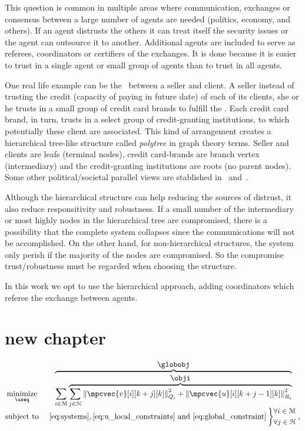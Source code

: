 \documentclass[../main.tex]{subfiles}
\begin{document}
This question is common in multiple areas where communication, exchanges or consensus between a large number of agents are needed (politics, economy, and others).
If an agent distrusts the others it can treat itself the security issues or the agent can outsource it to another.
Additional agents are included to serve as referees, coordinators or certifiers of the exchanges. It is done because it is easier to trust in a single agent or small group of agents than to trust in all agents.

One real life example can be the \EFT\ between a seller and client. A seller instead of trusting the credit (capacity of paying in future date) of each of its clients, she or he trusts in a small group of credit card brands to fulfill the \EFT{}.
Each credit card brand, in turn, trusts in a select group of credit-granting institutions, to which potentially these client are associated.
This kind of arrangement creates a hierarchical tree-like structure called \emph{polytree} in graph theory terms. Seller and clients are leafs (terminal nodes), credit card-brands are branch vertex (intermediary) and the credit-granting institutions are roots (no parent nodes).
Some other political/societal parallel views are stablished in~\cite{McNamaraEtAl2018} and~\cite{OlaruEtAl2018}.

Although the hierarchical structure can help reducing the sources of distrust, it also reduce responsitivity and robustness.
If a small number of the intermediary or most highly nodes in the hierarchical tree are compromised, there is a possibility that the complete system collapses since the communications will not be accomplished. On the other hand, for non-hierarchical structures, the system only perish if the majority of the nodes are compromised.
So the compromise trust/robustness must be regarded when choosing the structure.

In this work we opt to use the hierarchical approach, adding coordinators which referee the exchange between agents.

\chapter{new chapter}
\begin{equation}\label{eq:GOP}
  \begin{matrix}
    \underset{\useq}{\mathrm{minimize}}&\overbrace{\sum\limits_{i\in\set{M}} \overbrace{\sum_{j\in\set{H}}\norm{\mpcvec{v}[i][k+j][k]}^{2}_{Q_i}+\norm{\mpcvec{u}[i][k+j-1][k]}^{2}_{R_i}}^{\textstyle{} \obji}}^{\textstyle{} \globobj}\\
    \mathrm{subject~ to}&~\eqref{eq:systems},\eqref{eq:u_local_constraints}\ \mathrm{and}\ \eqref{eq:global_constraint}
    \left\}\small
      \begin{aligned}
        &\forall i\in\set{M}\\
        &\forall j\in\set{H}
      \end{aligned}\right.,
  \end{matrix}
\end{equation}
\end{document}
